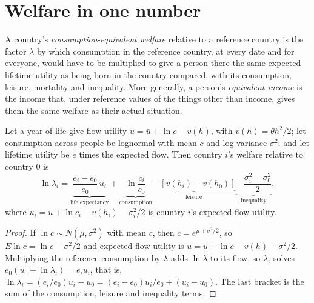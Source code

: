 \section{Welfare in one number}\label{sec:b3:income-and-wellbeing-evidence:welfare}

\begin{definition}\label{def:b3:income-and-wellbeing-evidence:welfare}
A country's \emph{consumption-equivalent welfare} relative to a reference country is
the factor $\lambda$ by which consumption in the reference country, at every date and for
everyone, would have to be multiplied to give a person there the same expected
lifetime utility as being born in the country compared, with its consumption, leisure,
mortality and inequality. More generally, a person's \emph{equivalent income} is the
income that, under reference values of the things other than income, gives them the
same welfare as their actual situation.
\end{definition}

\begin{proposition}\label{prop:b3:income-and-wellbeing-evidence:jk}
Let a year of life give flow utility $u = \bar u + \ln c - v(h)$, with $v(h) = \theta h^2/2$; let consumption across people be
lognormal with mean $c$ and log variance $\sigma^2$; and let lifetime utility be $e$ times the expected flow.
Then country $i$'s welfare relative to country $0$ is
\begin{equation*}
\ln\lambda_i = \underbrace{\frac{e_i - e_0}{e_0}\,u_i}_{\text{life expectancy}} + \underbrace{\ln\frac{c_i}{c_0}}_{\text{consumption}}
\underbrace{-\,[v(h_i) - v(h_0)]}_{\text{leisure}} \underbrace{-\,\frac{\sigma_i^2 - \sigma_0^2}{2}}_{\text{inequality}},
\end{equation*}
where $u_i = \bar u + \ln c_i - v(h_i) - \sigma_i^2/2$ is country $i$'s expected flow utility.
\end{proposition}

\begin{proof}
If $\ln c \sim N(\mu, \sigma^2)$ with mean $c$, then $c = e^{\mu + \sigma^2/2}$, so $E\ln c = \ln c - \sigma^2/2$ and expected flow utility is $u = \bar u + \ln c - v(h) - \sigma^2/2$.
Multiplying the reference consumption by $\lambda$ adds $\ln\lambda$ to its flow, so $\lambda_i$ solves $e_0(u_0 + \ln\lambda_i) = e_iu_i$, that is,
$\ln\lambda_i = (e_i/e_0)u_i - u_0 = (e_i - e_0)u_i/e_0 + (u_i - u_0)$. The last bracket is the sum of the consumption, leisure and inequality terms.
\end{proof}

